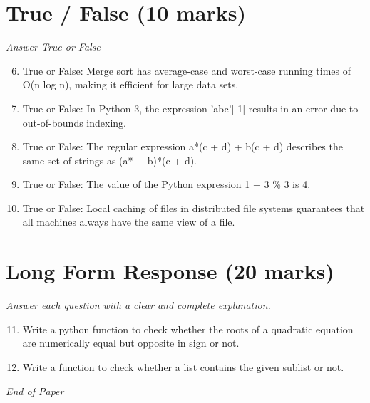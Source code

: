 \documentclass[12pt]{article}
\begin{document}
\section*{True / False (10 marks)}
\textit{Answer True or False}
\begin{enumerate}[label=\arabic*.]
\setcounter{enumi}{5}
\item True or False: Merge sort has average-case and worst-case running times of O(n log n), making it efficient for large data sets.
\item True or False: In Python 3, the expression 'abc'[-1] results in an error due to out-of-bounds indexing.
\item True or False: The regular expression a*(c + d) + b(c + d) describes the same set of strings as (a* + b)*(c + d).
\item True or False: The value of the Python expression 1 + 3 \% 3 is 4.
\item True or False: Local caching of files in distributed file systems guarantees that all machines always have the same view of a file.
\end{enumerate}

\section*{Long Form Response (20 marks)}
\textit{Answer each question with a clear and complete explanation.}
\begin{enumerate}[label=\arabic*.]
\setcounter{enumi}{10}
\item Write a python function to check whether the roots of a quadratic equation are numerically equal but opposite in sign or not.
\item Write a function to check whether a list contains the given sublist or not.
\end{enumerate}

\vfill
\noindent\textit{End of Paper}
\end{document}
